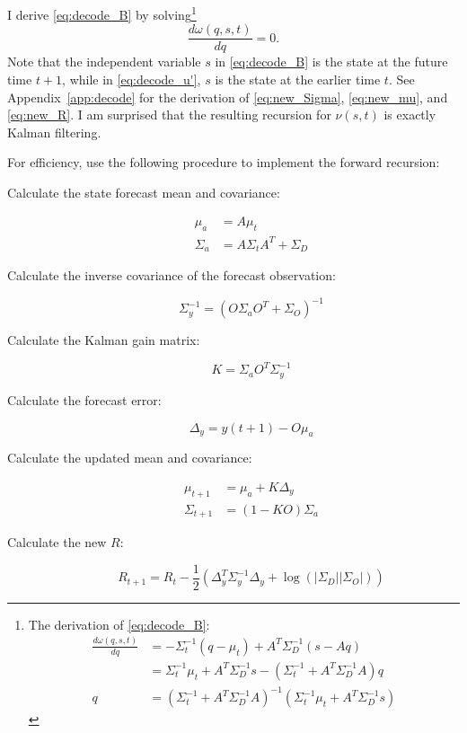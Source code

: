 \documentclass[12pt]{article}
\newcommand{\ti}[2]{{#1}{(#2)}}                         %
\newcommand{\logdet}{\log\left(\left|\Sigma_D\right| \left| \Sigma_O
    \right| \right)}
\begin{document}
I derive \eqref{eq:decode_B} by
solving\footnote{The derivation of \eqref{eq:decode_B}:
  \begin{align*}
    \frac{d \omega(q,s,t)}{d q} &= -\Sigma_t^{-1}(q-\mu_t) + A^T \Sigma_D^{-1}
    (s - Aq) \\
    &= \Sigma_t^{-1}\mu_t + A^T \Sigma_D^{-1} s -(\Sigma_t^{-1} +
    A^T\Sigma_D^{-1}A)q \\
    q &= \left( \Sigma_t^{-1} + A^T\Sigma_D^{-1}A\right)^{-1} \left(
      \Sigma_t^{-1}\mu_t + A^T \Sigma_D^{-1} s \right)
  \end{align*}
}
\begin{equation*}
  \frac{d \omega(q,s,t)}{d q} = 0.
\end{equation*}
Note that the independent variable $s$ in \eqref{eq:decode_B} is the
state at the future time $t+1$, while in \eqref{eq:decode_u'}, $s$ is
the state at the earlier time $t$.  See Appendix~\ref{app:decode} for
the derivation of \eqref{eq:new_Sigma}, \eqref{eq:new_mu}, and
\eqref{eq:new_R}.  I am surprised that the resulting recursion for
$\nu(s,t)$ is exactly Kalman filtering.

For efficiency, use the following procedure to implement the forward
recursion:
\begin{description}
\item[Calculate the state forecast mean and covariance:]
  \begin{align*}
    \mu_a &= A\mu_t \\
    \Sigma_a &= A \Sigma_t A^T + \Sigma_D
  \end{align*}
\item[Calculate the inverse covariance of the forecast observation:]
  \begin{equation*}
   \Sigma_y^{-1} = \left( O\Sigma_a O^T + \Sigma_O \right)^{-1}
  \end{equation*}
\item[Calculate the Kalman gain matrix:]
  \begin{equation*}
    K = \Sigma_a O^T \Sigma_y^{-1}
  \end{equation*}
\item[Calculate the forecast error:]
  \begin{equation*}
    \Delta_y = \ti{y}{t+1} - O\mu_a
  \end{equation*}
\item[Calculate the updated mean and covariance:]
  \begin{align}
    \label{eq:Sigma_alg}
    \mu_{t+1} &= \mu_a +  K\Delta_y \\
    \label{eq:mu_alg}
    \Sigma_{t+1} &= (1-KO)\Sigma_a
  \end{align}
\item[Calculate the new $R$:]
  \begin{equation}
    \label{eq:R_alg}
    R_{t+1} = R_t - \frac{1}{2} \left(\Delta_y^T \Sigma_y^{-1}
      \Delta_y + \logdet \right)
  \end{equation}
\end{description}
\end{document}
